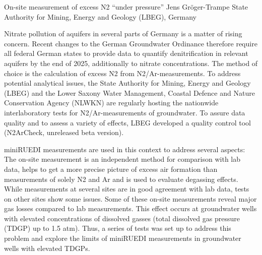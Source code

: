 \begin{conf-abstract}
{On-site measurement of excess N2 ``under pressure''}
{Jens Gröger-Trampe}
{State Authority for Mining, Energy and Geology (LBEG), Germany}
{Nitrate pollution of aquifers in several parts of Germany is a matter of rising concern. Recent changes to the German Groundwater Ordinance therefore require all federal German states to provide data to quantify denitrification in relevant aquifers by the end of 2025, additionally to nitrate concentrations. The method of choice is the calculation of excess N2 from N2/Ar-measurements. To address potential analytical issues, the State Authority for Mining, Energy and Geology (LBEG) and the Lower Saxony Water Management, Coastal Defence and Nature Conservation Agency (NLWKN) are regularly hosting the nationwide interlaboratory tests for N2/Ar-measurements of groundwater. To assure data quality and to assess a variety of effects, LBEG developed a quality control tool (N2ArCheck, unreleased beta version).

miniRUEDI measurements are used in this context to address several aspects: The on-site measurement is an independent method for comparison with lab data, helps to get a more precise picture of excess air formation than measurements of solely N2 and Ar and is used to evaluate degassing effects. While measurements at several sites are in good agreement with lab data, tests on other sites show some issues. Some of these on-site measurements reveal major gas losses compared to lab measurements. This effect occurs at groundwater wells with elevated concentrations of dissolved gasses (total dissolved gas pressure (TDGP) up to 1.5 atm). Thus, a series of tests was set up to address this problem and explore the limits of miniRUEDI measurements in groundwater wells with elevated TDGPs.}

\end{conf-abstract}
